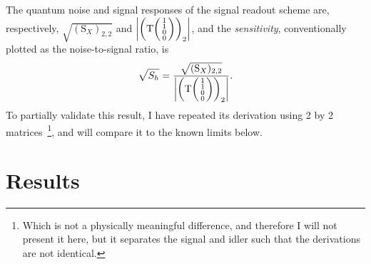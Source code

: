 The quantum noise and signal responses of the signal readout scheme are, respectively, $\sqrt{(\text{S}_X)_{2,2}}$ and $\abs{\left(\text{T}\begin{psmallmatrix}1 \\1\\0\\0\end{psmallmatrix}\right)_2}$, and the \emph{sensitivity}, conventionally plotted as the noise-to-signal ratio, is
\begin{equation}\label{eq:nIS_sigRO_sens}
\sqrt{S_h} = \frac{\sqrt{(\text{S}_X)_{2,2}}}{\abs{\left(\text{T}\begin{psmallmatrix}1 \\1\\0\\0\end{psmallmatrix}\right)_2}}.
\end{equation}
To partially validate this result, I have repeated its derivation using 2 by 2 matrices~\footnote{Which is not a physically meaningful difference, and therefore I will not present it here, but it separates the signal and idler such that the derivations are not identical.}, and will compare it to the known limits below. %


\section{Results}
\label{sec:nIS_sigRO_results}

